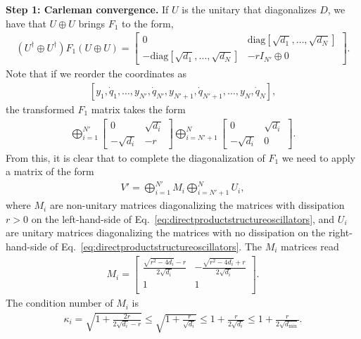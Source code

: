 \documentclass[superscriptaddress,onecolumn,nofootinbib,longbibliography,a4paper,accepted=2026-09-29]{quantumarticle}
\theoremstyle{plain}
\theoremstyle{definition}
\numberwithin{thm}{section}
\numberwithin{assumption}{section}
\numberwithin{lemma}{section}
\numberwithin{prop}{section}
\numberwithin{cor}{section}
\numberwithin{definition}{section}
\numberwithin{rmk}{section}
\numberwithin{equation}{section}
\begin{document}
\textbf{Step 1: Carleman convergence.} If $U$ is the unitary that diagonalizes $D$, we have that $U \oplus U$ brings $F_1$ to the form,
\begin{align}
   (U^\dag \oplus U^\dag) F_1 (U \oplus U)= \begin{bmatrix}
        0 & \mathrm{diag}[\sqrt{d_1}, \dots, \sqrt{d_N}] \\  - \mathrm{diag}[\sqrt{d_1}, \dots, \sqrt{d_N}] & -r I_{N'} \oplus 0
    \end{bmatrix}.
\end{align}
Note that if we reorder the coordinates as 
\begin{align}
    \label{eq:bqp_order}
    [y_1, \dot{q}_1, \dots,  y_{N'}, \dot{q}_{N'}, y_{N'+1}, \dot{q}_{N'+1}, \dots, y_N, \dot{q}_N ],
\end{align}
the transformed $F_1$ matrix takes the form
\begin{align}
\label{eq:directproductstructureoscillators}
    \bigoplus_{i=1}^{N'} \begin{bmatrix}
        0 & \sqrt{d_i} \\ 
       - \sqrt{d_i} & -r
    \end{bmatrix}   \bigoplus_{i=N'+1}^{N} \begin{bmatrix}
        0 & \sqrt{d_i} \\ 
       - \sqrt{d_i} & 0
    \end{bmatrix} .
\end{align}
From this, it is clear that to complete the diagonalization of $F_1$ we need to apply a matrix of the form
\begin{align}
V' = \bigoplus_{i=1}^{N'} M_i \bigoplus_{i=N'+1}^{N} U_i,
\end{align}
where $M_i$ are non-unitary matrices diagonalizing the matrices with dissipation $r>0$ on the left-hand-side of Eq.~\eqref{eq:directproductstructureoscillators}, and $U_i$ are unitary matrices diagonalizing the matrices with no dissipation on the right-hand-side of Eq.~\eqref{eq:directproductstructureoscillators}. The $M_i$ matrices read
\begin{align}
M_i = \left[
\begin{array}{cc}
 \frac{\sqrt{r^2-4 d_i}-r}{2 \sqrt{d_i}} & -\frac{\sqrt{r^2-4 d_i}+r}{2 \sqrt{d_i}} \\
 1 & 1 \\
\end{array}
\right].
\end{align}
The condition number of $M_i$ is
\begin{align}
    \kappa_ i = \sqrt{1+\frac{2 r}{2 \sqrt{d_i}-r}} \leq \sqrt{1+\frac{ r}{ \sqrt{d_i}}} \leq 1 + \frac{r}{2\sqrt{d_i}} \leq 1+ \frac{r}{2{ \sqrt{d_{\mathrm{min}}}}}.
\end{align}
\end{document}
